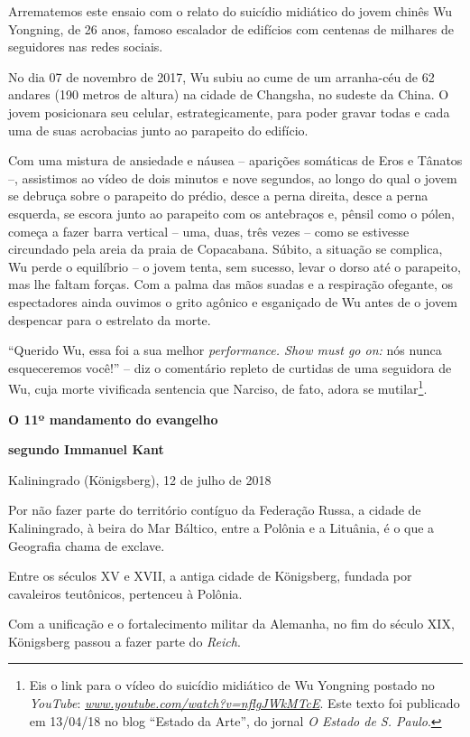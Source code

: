 Arrematemos este ensaio com o relato do suicídio midiático do jovem
chinês Wu Yongning, de 26 anos, famoso escalador de edifícios com
centenas de milhares de seguidores nas redes sociais.

No dia 07 de novembro de 2017, Wu subiu ao cume de um arranha-céu de 62
andares (190 metros de altura) na cidade de Changsha, no sudeste da
China. O jovem posicionara seu celular, estrategicamente, para poder
gravar todas e cada uma de suas acrobacias junto ao parapeito do
edifício.

Com uma mistura de ansiedade e náusea -- aparições somáticas de Eros e
Tânatos --, assistimos ao vídeo de dois minutos e nove segundos, ao
longo do qual o jovem se debruça sobre o parapeito do prédio, desce a
perna direita, desce a perna esquerda, se escora junto ao parapeito com
os antebraços e, pênsil como o pólen, começa a fazer barra vertical --
uma, duas, três vezes -- como se estivesse circundado pela areia da
praia de Copacabana. Súbito, a situação se complica, Wu perde o
equilíbrio -- o jovem tenta, sem sucesso, levar o dorso até o parapeito,
mas lhe faltam forças. Com a palma das mãos suadas e a respiração
ofegante, os espectadores ainda ouvimos o grito agônico e esganiçado de
Wu antes de o jovem despencar para o estrelato da morte.

``Querido Wu, essa foi a sua melhor \emph{performance. Show must go on:}
nós nunca esqueceremos você!'' -- diz o comentário repleto de curtidas
de uma seguidora de Wu, cuja morte vivificada sentencia que Narciso, de
fato, adora se mutilar\footnote{Eis o link para o vídeo do suicídio
  midiático de Wu Yongning postado no \emph{YouTube}:
  \href{http://www.youtube.com/watch?v=nflgJWkMTcE}{\emph{www.youtube.com/watch?v=nflgJWkMTcE}}.
  Este texto foi publicado em 13/04/18 no blog ``Estado da Arte'', do
  jornal \emph{O Estado de S. Paulo}.}.

\textbf{O 11º mandamento do evangelho }

\textbf{segundo Immanuel Kant}

Kaliningrado (Königsberg), 12 de julho de 2018

Por não fazer parte do território contíguo da Federação Russa, a cidade
de Kaliningrado, à beira do Mar Báltico, entre a Polônia e a Lituânia, é
o que a Geografia chama de exclave.

Entre os séculos XV e XVII, a antiga cidade de Königsberg, fundada por
cavaleiros teutônicos, pertenceu à Polônia.

Com a unificação e o fortalecimento militar da Alemanha, no fim do
século XIX, Königsberg passou a fazer parte do \emph{Reich}.

